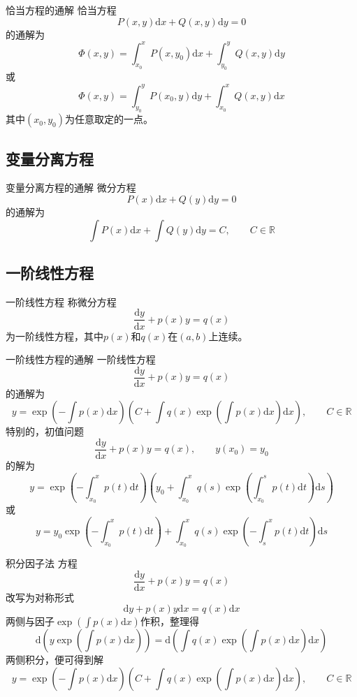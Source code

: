 \documentclass[lang = cn, scheme = chinese, thmcnt = section]{elegantbook}
\newcommand{\R}{\mathbb{R}}            %
\newcommand{\dd}{\mathrm{d}}           %
\begin{document}
\begin{theorem}{恰当方程的通解}
	恰当方程
	$$
	P(x,y)\mathrm{d}{x} +Q(x,y)\mathrm{d}{y} =0
	$$
	的通解为
	$$
	\Phi(x,y)=\int_{x_0}^{x}P(x,y_0)\mathrm{d}x+\int_{y_0}^{y}Q(x,y)\mathrm{d} y
	$$
	或
	$$
	\Phi(x,y)=\int_{y_0}^{y}P(x_0,y)\mathrm{d}y+\int_{x_0}^{x}Q(x,y)\mathrm{d}x
	$$
	其中$(x_0,y_0)$为任意取定的一点。
\end{theorem}

\subsection{变量分离方程}

\begin{theorem}{变量分离方程的通解}
	微分方程
	$$
	P(x)\dd x+Q(y)\dd y=0
	$$
	的通解为
	$$
	\int P(x)\mathrm{d} x +\int Q(y)\mathrm{d} y =C,\qquad C\in \R
	$$
\end{theorem}

\subsection{一阶线性方程}

\begin{definition}{一阶线性方程}
	称微分方程
	$$
	\frac{\mathrm{d} y}{\mathrm{d} x}+p(x)y=q(x)
	$$
	为一阶线性方程，其中$p(x)$和$q(x)$在$(a,b)$上连续。
\end{definition}

\begin{theorem}{一阶线性方程的通解}
	一阶线性方程
	$$
	\frac{\mathrm{d} y}{\mathrm{d} x}+p(x)y=q(x)
	$$
	的通解为
	$$
	y=\exp\left(-\int p(x)\mathrm{d} x\right)\left(C+\int q(x)\exp\left(\int p(x)\mathrm{d} x\right)\mathrm{d} x\right),\qquad C\in \R
	$$
	特别的，初值问题%
	$$
	\frac{\mathrm{d}{y}}{\mathrm{d}{x}}+p(x)y=q(x),\qquad
	y(x_0)=y_0
	$$
	的解为
	$$
	y=\exp\left(-\int_{x_0}^{x}{p(t)\mathrm{d}{t}}\right)\left(y_0+\int_{x_0}^{x}{q(s)\exp\left(\int_{x_0}^{s}{p(t)\mathrm{d}{t}}\right)\mathrm{d}{s}}\right)
	$$
	或
	$$
	y=y_{0}\exp\left(-\int_{x_0}^{x}{p(t)\mathrm{d}{t}}\right)+\int_{x_0}^{x}{q(s)\exp\left(-\int_{s}^{x}{p(t)\mathrm{d}{t}}\right)\mathrm{d}{s}}
	$$
\end{theorem}

\begin{theorem}{积分因子法}
	方程
	$$
	\frac{\mathrm{d} y}{\mathrm{d} x}+p(x)y=q(x)
	$$
	改写为对称形式
	\[ \mathrm{d} y+p(x)y\mathrm{d} x=q(x)\mathrm{d} x \]
	两侧与因子$\displaystyle \exp\left(\int p(x)\mathrm{d} x\right)$作积，整理得
	\[ \dd\left(y\exp\left(\int{p(x)\mathrm{d}{x}}\right)\right)=\mathrm{d}\left({\int{q(x)\exp\left(\int{p(x)\mathrm{d}{x}}\right)\mathrm{d}{x}}}\right)
	 \]
	两侧积分，便可得到解
	$$
	y=\exp\left(-\int p(x)\mathrm{d} x\right)\left(C+\int q(x)\exp\left(\int p(x)\mathrm{d} x\right)\mathrm{d} x\right),\qquad C\in \R
	$$
\end{theorem}
\end{document}
